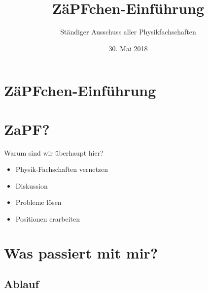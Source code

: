 \documentclass[compress,]{beamer}
\title[ZäPFchen-Einführung]{ZäPFchen-Einführung}
\author{Ständiger Ausschuss aller Physikfachschaften}
\institute[Zusammenkunft aller Physikfachschaften]
\date{30. Mai 2018}
\begin{document}
\begin{frame}
  \titlepage

\end{frame}

\section{ZäPFchen-Einführung}


\section{ZaPF?}

\begin{frame}{Warum sind wir überhaupt hier?}

  \begin{itemize}
  \item Physik-Fachschaften vernetzen
  \item Diskussion
  \item Probleme lösen
  \item Positionen erarbeiten
  \end{itemize}

\end{frame}


\section{Was passiert mit mir?}

\subsection{Ablauf}
\end{document}
